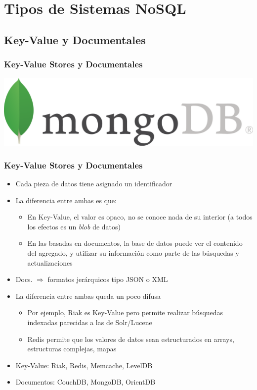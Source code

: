 \documentclass[14pt]{beamer}
\begin{document}
\section{Tipos de Sistemas NoSQL}


\subsection{Key-Value y Documentales}

\begin{frame}
  \frametitle{Key-Value Stores y Documentales}
  \includegraphics[width=\textwidth]{img/MongoDB}
\end{frame}

\begin{frame}
  \frametitle{Key-Value Stores y Documentales}
\vspace*{-.9em}
\begin{itemize}
\item Cada pieza de datos tiene asignado un identificador
\item La diferencia entre ambas es que:
  \begin{itemize}
  \item En Key-Value, el valor es opaco, no se conoce nada de su interior
    (a todos los efectos es un {\em blob\/} de datos)
\item En las basadas en documentos, la base de datos puede ver el contenido
  del agregado, y utilizar su información como parte de las búsquedas y
  actualizaciones
\end{itemize}
\item Docs. $\Rightarrow$ formatos jerárquicos tipo JSON o XML
\item La diferencia entre ambas queda un poco difusa
  \begin{itemize}
  \item Por ejemplo, Riak es Key-Value pero permite realizar búsquedas
    indexadas parecidas a las de Solr/Lucene
\item Redis permite que los valores de datos sean estructurados en arrays,
  estructuras complejas, mapas
  \end{itemize}
\item Key-Value: Riak, Redis, Memcache, LevelDB
\item Documentos: CouchDB, MongoDB, OrientDB
\end{itemize}
\end{frame}
\end{document}
